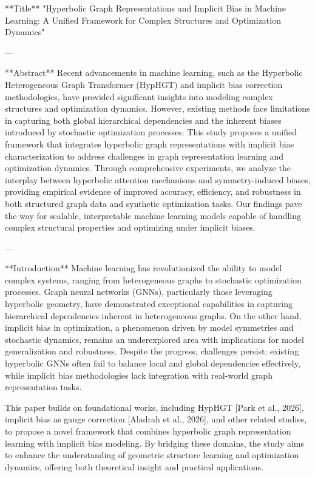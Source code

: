 **Title**  
"Hyperbolic Graph Representations and Implicit Bias in Machine Learning: A Unified Framework for Complex Structures and Optimization Dynamics"

---

**Abstract**  
Recent advancements in machine learning, such as the Hyperbolic Heterogeneous Graph Transformer (HypHGT) and implicit bias correction methodologies, have provided significant insights into modeling complex structures and optimization dynamics. However, existing methods face limitations in capturing both global hierarchical dependencies and the inherent biases introduced by stochastic optimization processes. This study proposes a unified framework that integrates hyperbolic graph representations with implicit bias characterization to address challenges in graph representation learning and optimization dynamics. Through comprehensive experiments, we analyze the interplay between hyperbolic attention mechanisms and symmetry-induced biases, providing empirical evidence of improved accuracy, efficiency, and robustness in both structured graph data and synthetic optimization tasks. Our findings pave the way for scalable, interpretable machine learning models capable of handling complex structural properties and optimizing under implicit biases.

---

**Introduction**  
Machine learning has revolutionized the ability to model complex systems, ranging from heterogeneous graphs to stochastic optimization processes. Graph neural networks (GNNs), particularly those leveraging hyperbolic geometry, have demonstrated exceptional capabilities in capturing hierarchical dependencies inherent in heterogeneous graphs. On the other hand, implicit bias in optimization, a phenomenon driven by model symmetries and stochastic dynamics, remains an underexplored area with implications for model generalization and robustness. Despite the progress, challenges persist: existing hyperbolic GNNs often fail to balance local and global dependencies effectively, while implicit bias methodologies lack integration with real-world graph representation tasks.

This paper builds on foundational works, including HypHGT [Park et al., 2026], implicit bias as gauge correction [Aladrah et al., 2026], and other related studies, to propose a novel framework that combines hyperbolic graph representation learning with implicit bias modeling. By bridging these domains, the study aims to enhance the understanding of geometric structure learning and optimization dynamics, offering both theoretical insight and practical applications.

